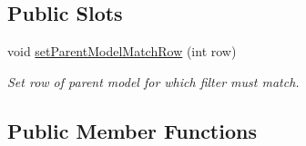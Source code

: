 \subsection*{Public Slots}
\begin{DoxyCompactItemize}
\item 
void \hyperlink{class_mdt_1_1_item_model_1_1_relation_filter_proxy_model_a579d6e207d62ebf98989eb191acfde72}{set\+Parent\+Model\+Match\+Row} (int row)
\begin{DoxyCompactList}\small\item\em Set row of parent model for which filter must match. \end{DoxyCompactList}\end{DoxyCompactItemize}
\subsection*{Public Member Functions}
